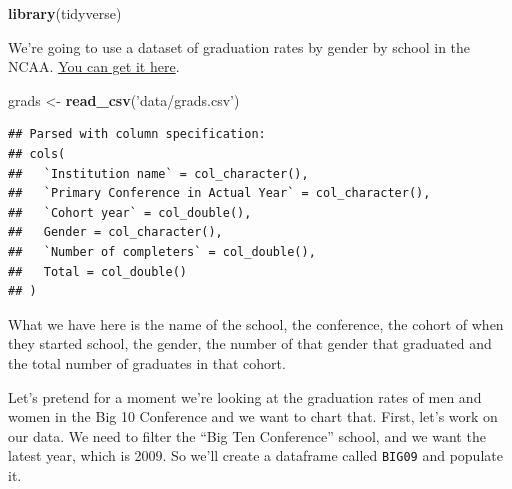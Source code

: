 \documentclass[]{book}
\newenvironment{Shaded}{\begin{snugshade}}{\end{snugshade}}
\newcommand{\KeywordTok}[1]{\textcolor[rgb]{0.13,0.29,0.53}{\textbf{#1}}}
\newcommand{\DataTypeTok}[1]{\textcolor[rgb]{0.13,0.29,0.53}{#1}}
\newcommand{\DecValTok}[1]{\textcolor[rgb]{0.00,0.00,0.81}{#1}}
\newcommand{\StringTok}[1]{\textcolor[rgb]{0.31,0.60,0.02}{#1}}
\newcommand{\OperatorTok}[1]{\textcolor[rgb]{0.81,0.36,0.00}{\textbf{#1}}}
\newcommand{\NormalTok}[1]{#1}
\begin{document}
\begin{Shaded}
\begin{Highlighting}[]
\KeywordTok{library}\NormalTok{(tidyverse)}
\end{Highlighting}
\end{Shaded}

We're going to use a dataset of graduation rates by gender by school in
the NCAA.
\href{https://unl.box.com/s/3nw1eokvs9zfdjyzvjaj3xdq01rm8sym}{You can
get it here}.

\begin{Shaded}
\begin{Highlighting}[]
\NormalTok{grads <-}\StringTok{ }\KeywordTok{read_csv}\NormalTok{(}\StringTok{'data/grads.csv'}\NormalTok{)}
\end{Highlighting}
\end{Shaded}

\begin{verbatim}
## Parsed with column specification:
## cols(
##   `Institution name` = col_character(),
##   `Primary Conference in Actual Year` = col_character(),
##   `Cohort year` = col_double(),
##   Gender = col_character(),
##   `Number of completers` = col_double(),
##   Total = col_double()
## )
\end{verbatim}

What we have here is the name of the school, the conference, the cohort
of when they started school, the gender, the number of that gender that
graduated and the total number of graduates in that cohort.

Let's pretend for a moment we're looking at the graduation rates of men
and women in the Big 10 Conference and we want to chart that. First,
let's work on our data. We need to filter the ``Big Ten Conference''
school, and we want the latest year, which is 2009. So we'll create a
dataframe called \texttt{BIG09} and populate it.

\begin{Shaded}
\end{Shaded}
\end{document}
